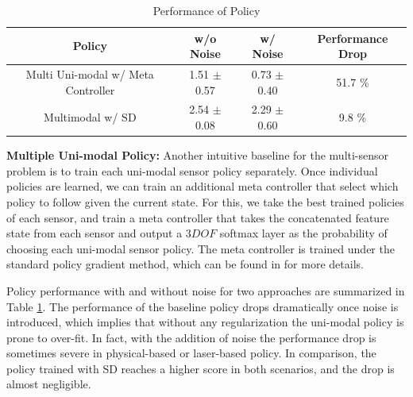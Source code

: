 \documentclass[../thesis.tex]{subfiles}
\begin{document}
 
\begin{table}[t]
	\vskip 0.1in
	\caption{Performance of Policy }
	\label{table:multiple-uni-baseline}
	\vskip 0.1in
	\centering
	\begin{small}
	\begin{sc}
	\begin{tabular}{c|cc|c}
	\toprule
    \centering
	Policy & w/o Noise & w/ Noise & Performance Drop \\ \midrule \midrule
 	Multi Uni-modal w/ Meta Controller & 1.51 $\pm$ 0.57 & 0.73 $\pm$ 0.40 & 51.7 \% \\
 	Multimodal w/ SD & 2.54 $\pm$ 0.08 & 2.29 $\pm$ 0.60 & 9.8 \% \\ \toprule
	\end{tabular}
	\end{sc}
	\end{small}
\end{table}
 
\textbf{Multiple Uni-modal Policy:}
Another intuitive baseline for the multi-sensor problem is to train each uni-modal sensor policy separately. Once individual policies are learned, we can train an additional meta controller that select which policy to follow given the current state.
For this, we take the best trained policies of each sensor, and train a meta controller that takes the concatenated feature state from each sensor and output a $3 DOF$ softmax layer as the probability of choosing each uni-modal sensor policy. The meta controller is trained under the standard policy gradient method, which can be found in \cite{meta_policy} for more details.
 
Policy performance with and without noise for two approaches are summarized in Table \ref{table:multiple-uni-baseline}.
The performance of the baseline policy drops dramatically once noise is introduced, which implies that without any regularization the uni-modal policy is prone to over-fit. In fact, with the addition of noise the performance drop is sometimes severe in physical-based or laser-based policy.
In comparison, the policy trained with SD reaches a higher score in both scenarios, and the drop is almost negligible.
 
 
 
 
\end{document}
